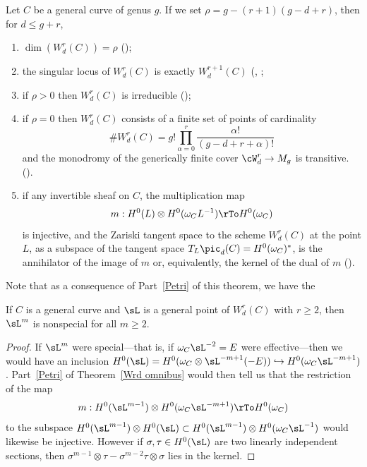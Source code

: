 \begin{theorem}\label{Wrd omnibus}
Let $C$ be a general curve of genus $g$. If we set $\rho = g - (r+1)(g-d+r)$, then for $d \leq g+r$,
\begin{enumerate}

\item $\dim(W^r_d(C)) = \rho$ (\cite{Griffiths-Harris-BN});

\item\label{sing wrd} the singular locus of $W^r_d(C)$ is exactly $W^{r+1}_d(C)$
(\cite{Gieseker-Petri}, \cite{Lazarsfeld-Petri};
\label{irr wrd} 

\item if $\rho > 0$ then $W^r_d(C)$ is irreducible (\cite{MR611386});

\item\label{rho=0} if $\rho = 0$ then $W^r_d(C)$ consists of a finite set of  points of cardinality
$$
\#W^r_d(C) = g! \prod_{\alpha=0}^r \frac{\alpha!}{(g-d+r+\alpha)!}
$$
and the monodromy of the generically finite cover $\cW^r_d \to M_g$ is transitive.
(\cite{zbMATH04014883}).

\item\label{Petri} if any invertible sheaf on $C$, the multiplication map
$$
m : H^0(L) \otimes H^0(\omega_CL^{-1}) \rTo H^0(\omega_C)
$$
is injective, and the Zariski tangent space to the scheme $W^r_d(C)$ at the point $L$, as a subspace
of the tangent space $T_L\pic_d(C) = H^0(\omega_C)^*$, is the annihilator of the image of $m$
or, equivalently, the kernel of the dual of $m$ (\cite{Gieseker-Petri}).
\end{enumerate}
\end{theorem}

Note that as a consequence of Part~\ref{Petri} of this theorem, we have the

\begin{corollary}\label{2L nonspecial}
If $C$ is a general curve and $\sL$ is a general point of $W^r_d(C)$ with $r\geq 2$,
 then $\sL^m$ is nonspecial for all $m \geq 2$.
\end{corollary}

\begin{proof}
If $\sL^m$ were special---that is, if $\omega_C\sL^{-2} = E$ were effective---then we would have an inclusion $H^0(\sL) = H^0(\omega_C\otimes \sL^{-m+1}(-E)) \hookrightarrow H^0(\omega_C\sL^{-m+1})$. Part~\ref{Petri} of Theorem~\ref{Wrd omnibus} would then tell us that the restriction of the map 
 $$
m : H^0(\sL^{m-1}) \otimes H^0(\omega_C\sL^{-m+1}) \rTo H^0(\omega_C)
$$
to the subspace $H^0(\sL^{m-1}) \otimes H^0(\sL) \subset H^0(\sL^{m-1}) \otimes H^0(\omega_C\sL^{-1})$ would likewise be injective.
However if $\sigma, \tau \in H^0(\sL)$ are two linearly independent sections, then $\sigma^{m-1} \otimes \tau - \sigma^{m-2}\tau \otimes \sigma$ lies in the kernel.
\end{proof}


